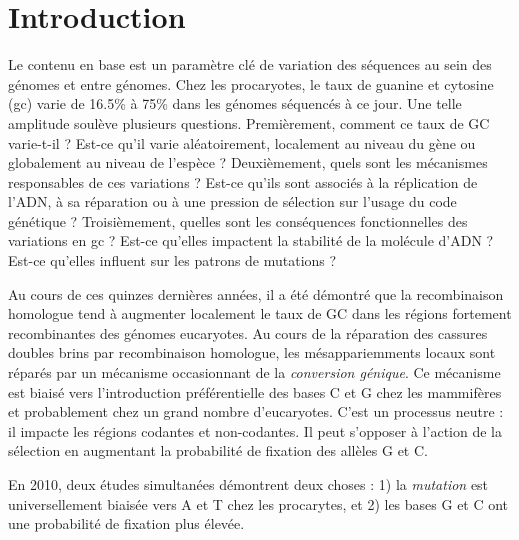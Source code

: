 
\section*{Introduction}
\label{sec:introduction}

Le contenu en base est un paramètre clé de variation des séquences au sein des
génomes et entre génomes. Chez les procaryotes, le taux de guanine et cytosine
(\ac{gc}) varie de 16.5\% à 75\% dans les génomes séquencés à ce jour. Une
telle amplitude soulève plusieurs questions. Premièrement, comment ce taux de
GC varie-t-il ? Est-ce qu'il varie aléatoirement, localement au niveau du gène
ou globalement au niveau de l'espèce ? Deuxièmement, quels sont les mécanismes
responsables de ces variations ? Est-ce qu'ils sont associés à la réplication
de l'ADN, à sa réparation ou à une pression de sélection sur l'usage du code
génétique ?  Troisièmement, quelles sont les conséquences fonctionnelles des
variations en \ac{gc} ? Est-ce qu'elles impactent la stabilité de la molécule
d'ADN ?  Est-ce qu'elles influent sur les patrons de mutations ?

Au cours de ces quinzes dernières années, il a été démontré que la
recombinaison homologue tend à augmenter localement le taux de GC dans les
régions fortement recombinantes des génomes
eucaryotes\cite{duret_biased_2009,lesecque_gc-biased_2013}. Au cours de la
réparation des cassures doubles brins par recombinaison homologue, les
mésappariemments locaux sont réparés par un mécanisme occasionnant de la
\emph{conversion génique}\cite{chen_gene_2007}. Ce mécanisme est biaisé vers
l'introduction préférentielle des bases C et G chez les mammifères et
probablement chez un grand nombre d'eucaryotes\cite{pessia_evidence_2012}.
C'est un processus neutre : il impacte les régions codantes et non-codantes. Il
peut s'opposer à l'action de la sélection en augmentant la probabilité de
fixation des allèles G et C\cite{ratnakumar_detecting_2010}.

En 2010, deux études simultanées\cite{hildebrand_evidence_2010,
hershberg_evidence_2010} démontrent deux choses : 1) la \emph{mutation}
est universellement biaisée vers A et T chez les procarytes, et 2) les bases G
et C ont une probabilité de fixation plus élevée.
